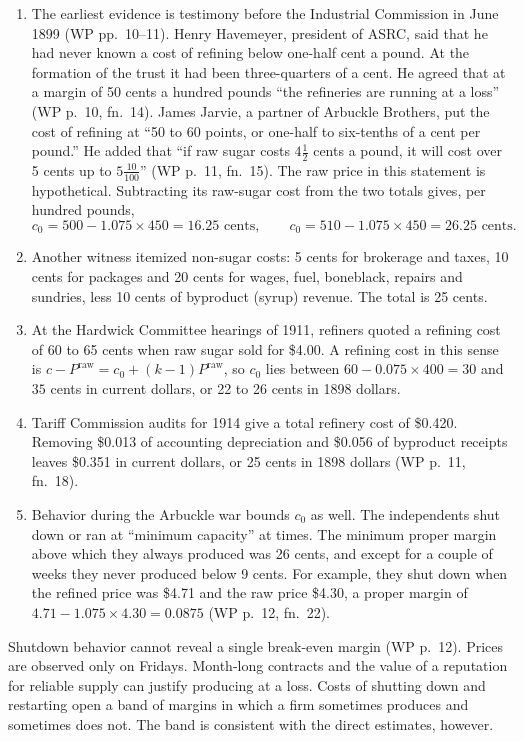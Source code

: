 \begin{enumerate}[label=(\roman*)]
\item The earliest evidence is testimony before the Industrial Commission in June 1899 (WP pp.~10--11). Henry
Havemeyer, president of ASRC, said that he had never known a cost of refining below one-half cent a pound. At the
formation of the trust it had been three-quarters of a cent. He agreed that at a margin of 50 cents a hundred pounds
``the refineries are running at a loss'' (WP p.~10, fn.~14). James Jarvie, a partner of Arbuckle Brothers, put the
cost of refining at ``50 to 60 points, or one-half to six-tenths of a cent per pound.'' He added that ``if raw sugar
costs $4\frac{1}{2}$ cents a pound, it will cost over 5 cents up to $5\frac{10}{100}$'' (WP p.~11, fn.~15). The raw price in this statement is hypothetical. Subtracting its raw-sugar cost from the two
totals gives, per hundred pounds,
\begin{equation*}
c_0 = 500 - 1.075 \times 450 = 16.25 \text{ cents},
\qquad
c_0 = 510 - 1.075 \times 450 = 26.25 \text{ cents}.
\end{equation*}
\item Another witness itemized non-sugar costs: 5 cents for brokerage and taxes, 10 cents for packages and
20 cents for wages, fuel, boneblack, repairs and sundries, less 10 cents of byproduct (syrup) revenue. The
total is 25 cents.
\item At the Hardwick Committee hearings of 1911, refiners quoted a refining cost of 60 to 65 cents when raw
sugar sold for \$4.00. A refining cost in this sense is $c - P^{\mathrm{raw}} = c_0 + (k - 1)P^{\mathrm{raw}}$,
so $c_0$ lies between $60 - 0.075 \times 400 = 30$ and $35$ cents in current dollars, or 22 to 26 cents in
1898 dollars.
\item Tariff Commission audits for 1914 give a total refinery cost of \$0.420. Removing \$0.013 of accounting
depreciation and \$0.056 of byproduct receipts leaves \$0.351 in current dollars, or 25 cents in 1898
dollars (WP p.~11, fn.~18).
\item Behavior during the Arbuckle war bounds $c_0$ as well. The independents shut down or ran at
``minimum capacity'' at times. The minimum proper margin above which they always produced was 26 cents, and
except for a couple of weeks they never produced below 9 cents. For example, they shut down when the refined
price was \$4.71 and the raw price \$4.30, a proper margin of $4.71 - 1.075 \times 4.30 = 0.0875$ (WP p.~12,
fn.~22).
\end{enumerate}
Shutdown behavior cannot reveal a single break-even margin (WP p.~12). Prices are observed only on Fridays.
Month-long contracts and the value of a reputation for reliable supply can justify producing at a loss. Costs
of shutting down and restarting open a band of margins in which a firm sometimes produces and sometimes does
not. The band is consistent with the direct estimates, however.

